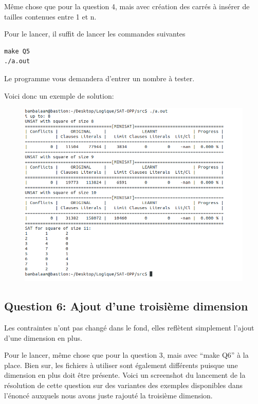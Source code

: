 \documentclass[a4paper,10pt]{article}
\begin{document}
Même chose que pour la question 4, mais avec création des carrés à insérer de tailles contenues entre 1 et n.

Pour le lancer, il suffit de lancer les commandes suivantes
\begin{lstlisting}
make Q5
./a.out
\end{lstlisting}

Le programme vous demandera d'entrer un nombre à tester.

Voici donc un exemple de solution:

\begin{figure}[htb!]
\centering
\includegraphics[scale=0.50]{SAT-Q5}
\end{figure}

\newpage

\subsection{Question 6: Ajout d'une troisième dimension}

Les contraintes n'ont pas changé dans le fond, elles reflètent simplement l'ajout d'une dimension en plus.

Pour le lancer, même chose que pour la question 3, mais avec ``make Q6'' à la place. Bien sur, les fichiers à utiliser sont également différents puisque une dimension en plus doit être présente. Voici un screenshot du lancement de la résolution de cette question sur des variantes des exemples disponibles dans l'énoncé auxquels nous avons juste rajouté la troisième dimension.
\end{document}
